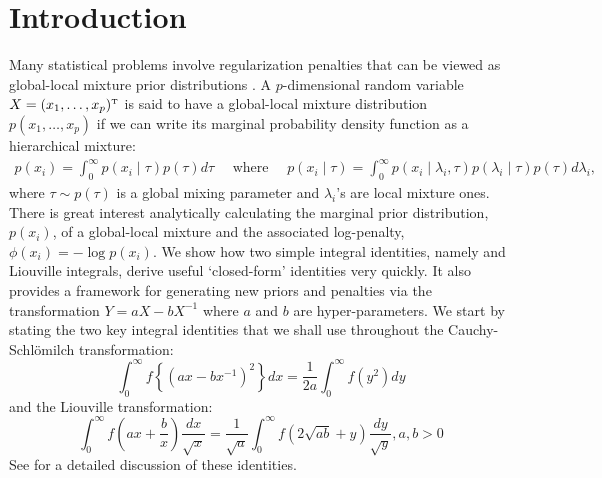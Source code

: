 \documentclass[letterpaper,11pt]{article}
\begin{document}
\section{Introduction}
Many statistical problems involve regularization penalties that can be viewed as global-local mixture prior distributions \citep{polson2011data, hans2011comment}. A $p$-dimensional random variable $X = (x_1, \ldots, x_p)^{{ \mathrm{\scriptscriptstyle T} }}$ is said to have a global-local mixture distribution $p(x_1, \ldots, x_p)$ if we can write its marginal probability density function as a hierarchical mixture: 
\begin{gather*}
p(x_i) = \int_{0}^{\infty} p(x_i \mid \tau) p(\tau) d\tau \quad \text{ where } \quad
p( x_i \mid \tau) = \int_{0}^{\infty} p(x_i \mid \lambda_i, \tau) p(\lambda_i \mid \tau) p(\tau) d\lambda_i, 
\end{gather*}
where $\tau \sim p(\tau)$ is a global mixing parameter and $\lambda_i$'s are local mixture ones. There is great interest analytically calculating the marginal prior distribution, $p(x_i)$, of a global-local mixture and the associated log-penalty, $\phi(x_i) = -\log p(x_i)$. We show how two simple integral identities, namely \CS and Liouville integrals, derive useful `closed-form' identities very quickly. It also provides a framework for generating new priors and penalties via the transformation $Y = a X - b X^{-1}$ where $a$ and $b$ are hyper-parameters. 
We start by stating the two key integral identities that we shall use throughout the Cauchy-Schl\"omilch transformation: 
\begin{equation}
\int_0^\infty f \left\{ ( a x - b x^{-1} )^2 \right\} d x = \frac{1}{2a} \int_0^\infty f(y^2) d y \label{eq:identity}
\end{equation}
and the Liouville transformation:
\begin{equation}
\int_{0}^{\infty} f\left(ax + \frac{b}{x} \right) \frac{dx}{\sqrt{x}} = \frac{1}{\sqrt{a}} \int_{0}^{\infty} f \left( 2\sqrt{ab} + y \right) \frac{dy}{\sqrt{y}}, a,b >0 \label{eq:liouville}
\end{equation}
See \cite{boros2006irresistible,baker2008probabilistic,amdeberhan2010cauchy,jones2014generating} for a detailed discussion of these identities. 
\end{document}
